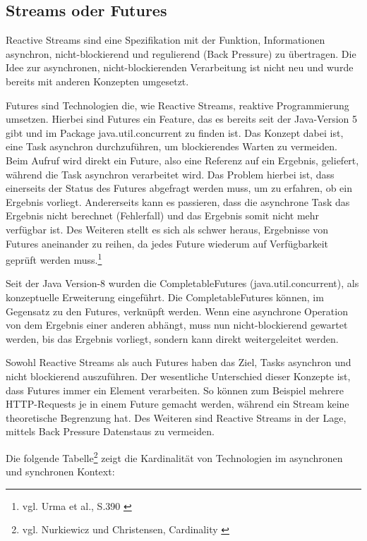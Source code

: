 \subsection{Streams oder Futures} \label{FutuProm}
Reactive Streams sind eine Spezifikation mit der Funktion, Informationen asynchron, nicht-blockierend und regulierend (Back Pressure) zu übertragen. Die Idee zur asynchronen, nicht-blockierenden Verarbeitung ist nicht neu und wurde bereits mit anderen Konzepten umgesetzt.

Futures sind Technologien die, wie Reactive Streams, reaktive Programmierung umsetzen.
Hierbei sind Futures ein Feature, das es bereits seit der Java-Version 5 gibt und im Package java.util.concurrent zu finden ist. Das Konzept dabei ist, eine Task asynchron durchzuführen, um blockierendes Warten zu vermeiden. Beim Aufruf wird direkt ein Future, also eine Referenz auf ein Ergebnis, geliefert, während die Task asynchron verarbeitet wird. Das Problem hierbei ist, dass einerseits der Status des Futures abgefragt werden muss, um zu erfahren, ob ein Ergebnis vorliegt. Andererseits kann es passieren, dass die asynchrone Task das Ergebnis nicht berechnet (Fehlerfall) und das Ergebnis somit nicht mehr verfügbar ist. Des Weiteren stellt es sich als schwer heraus, Ergebnisse von Futures aneinander zu reihen, da jedes Future wiederum auf Verfügbarkeit geprüft werden muss.\footnote{vgl. Urma et al., S.390 \cite{buch:modern_java_in_action:kapitel16} \label{futuresnpromisses}}

Seit der Java Version-8 wurden die CompletableFutures (java.util.concurrent), als konzeptuelle Erweiterung eingeführt. Die CompletableFutures können, im Gegensatz zu den Futures, verknüpft werden. Wenn eine asynchrone Operation von dem Ergebnis einer anderen abhängt, muss nun nicht-blockierend gewartet werden, bis das Ergebnis vorliegt, sondern kann direkt weitergeleitet werden. 

Sowohl Reactive Streams als auch Futures haben das Ziel, Tasks asynchron und nicht blockierend auszuführen. Der wesentliche Unterschied dieser Konzepte ist, dass Futures immer ein Element verarbeiten. So können zum Beispiel mehrere HTTP-Requests je in einem Future gemacht werden, während ein Stream keine theoretische Begrenzung hat. Des Weiteren sind Reactive Streams in der Lage, mittels Back Pressure Datenstaus zu vermeiden.

Die folgende Tabelle\footnote{vgl. Nurkiewicz und Christensen, Cardinality \cite{buch:reactive_programming_with_rxjava:kapitel1}} zeigt die Kardinalität von Technologien im asynchronen und synchronen Kontext: 

